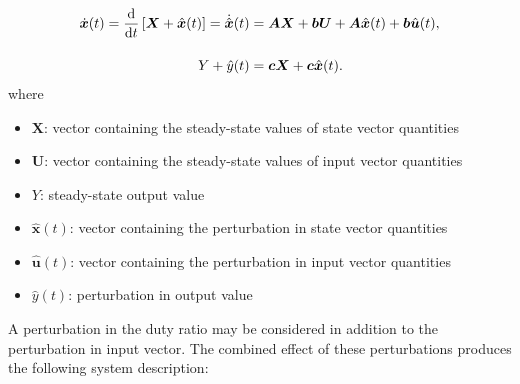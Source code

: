 \begin{align}
\dot{\boldsymbol{x}}(t) = \frac{\mathrm{d}}{\mathrm{d} t} \left[\boldsymbol{X} + \hat{\boldsymbol{x}}(t)\right] = \dot{\hat{\boldsymbol{x}}}(t)
&=
\boldsymbol{A} \boldsymbol{X} + \boldsymbol{b} \boldsymbol{U} + \boldsymbol{A} \hat{\boldsymbol{x}}(t) + \boldsymbol{b} \hat{\boldsymbol{u}}(t),\nonumber
\\[11pt]
Y + \hat{y}(t) &= \boldsymbol{c} \boldsymbol{X} + \boldsymbol{c}
\hat{\boldsymbol{x}}(t).\label{eqn:inputperturb}
\end{align}
where
\begin{itemize}
\item $\boldsymbol{X}$: vector containing the steady-state values of state vector quantities
\item $\boldsymbol{U}$: vector containing the steady-state values of input vector quantities
\item $Y$: steady-state output value
\item $\hat{\boldsymbol{x}}(t)$: vector containing the perturbation in state vector quantities
\item $\hat{\boldsymbol{u}}(t)$: vector containing the perturbation in input vector quantities
\item $\hat{y}(t)$: perturbation in output value
\end{itemize}
\iffalse
Separating the steady-state part from the time-varying part yields:
\begin{align*}
\boldsymbol{A} \boldsymbol{X} + \boldsymbol{b} \boldsymbol{U} &= 0
\\[11pt]
Y &= \boldsymbol{c} \boldsymbol{X}
\end{align*}
and
\begin{align*}
\dot{\hat{\boldsymbol{x}}}(t) &= \boldsymbol{A} \hat{\boldsymbol{x}}(t) + \boldsymbol{b} \hat{\boldsymbol{u}}(t)
\\[11pt]
\hat{y}(t) &= \boldsymbol{c} \hat{\boldsymbol{x}}(t)
\end{align*}
and the following relationship between steady-state quantities:
\begin{align*}
\boldsymbol{X} &= \minus \boldsymbol{A}^{-1} \boldsymbol{b} \boldsymbol{U}
\\[11pt]
Y &= \minus \boldsymbol{c} \boldsymbol{A}^{-1} \boldsymbol{b} \boldsymbol{U}
\end{align*}
\fi
A perturbation in the duty ratio may be considered in addition to the perturbation in input vector. The combined effect of these perturbations produces the following system description:
